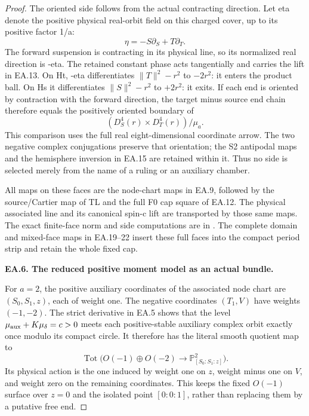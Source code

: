 \begin{proof}
The oriented side follows from the actual contracting direction.
Let eta denote the positive physical real-orbit field on this
charged cover, up to its positive factor 1/a:
\[
                       \eta=-S\partial_S+T\partial_T.
\]
The forward suspension is contracting in its physical line, so
its normalized real direction is -eta. The retained constant
phase acts tangentially and carries the lift in EA.13. On Ht,
-eta differentiates \(\|T\|^2-r^2\) to \(-2r^2\): it
enters the product ball. On Hs it differentiates
\(\|S\|^2-r^2\) to \(+2r^2\): it exits. If each end is
oriented by contraction with the forward direction, the target
minus source end chain therefore equals the positively oriented
boundary of
\[
                       (D^4_S(r)\times D^4_T(r))/\mu_a.
 \tag{P3K.80.EA.41}
\]
This comparison uses the full real eight-dimensional coordinate
arrow. The two negative complex conjugations preserve that
orientation; the S2 antipodal maps and the hemisphere inversion
in EA.15 are retained within it. Thus no side is selected merely
from the name of a ruling or an auxiliary chamber.

All maps on these faces are the node-chart maps in EA.9, followed
by the source/Cartier map of TL and the full F0 cap square of
EA.12. The physical associated line and its canonical spin-c
lift are transported by those same maps. The exact finite-face
norm and side computations are in
.
The complete domain and mixed-face maps in EA.19--22 insert these full faces into the compact period strip and retain the whole fixed cap.

\par\medskip\noindent\textbf{EA.6. The reduced positive moment model as an actual bundle.}\par\nopagebreak[4]

For \(a=2\), the positive auxiliary coordinates of the associated node
chart are \((S_0,S_1,z)\), each of weight one. The negative coordinates
\((T_1,V)\) have weights \((-1,-2)\). The strict derivative in EA.5
shows that the level \(\mu_{\rm aux}+K\mu_\delta=c>0\) meets each
positive-stable auxiliary complex orbit exactly once modulo its compact
circle. It therefore has the literal smooth quotient map to
\[
 \operatorname{Tot}\bigl(O(-1)\oplus O(-2)\longrightarrow
                         \mathbb P^2_{[S_0:S_1:z]}\bigr).
 \tag{P3K.80.EA.16}
\]
Its physical action is the one induced by weight one on \(z\), weight
minus one on \(V\), and weight zero on the remaining coordinates. This
keeps the fixed \(O(-1)\) surface over \(z=0\) and the isolated point
\([0:0:1]\), rather than replacing them by a putative free end.


\end{proof}
